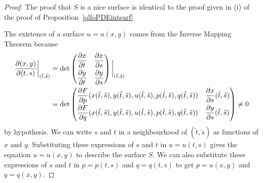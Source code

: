 \begin{proof}
 The proof that $S$ is a nice surface is identical to the
proof given in (i) of the proof of Proposition~\ref{qlfoPDEintsurf}

 The existence of a surface
$u=u(x,y)$ comes from the Inverse Mapping Theorem because
\begin{align*}
\frac{\partial(x,y)}{\partial(t,s)}\bigg|_{(\tilde{t},\tilde{s})} &= \det
\begin{pmatrix}
\displaystyle \frac{\partial{x}}{\partial t} & \displaystyle \frac{\partial{x}}{\partial s} \\[0.7em]
\displaystyle \frac{\partial{y}}{\partial t} & \displaystyle \frac{\partial{y}}{\partial s}
\end{pmatrix}\bigg|_{(\tilde{t},\tilde{s})} \\
&= \det \begin{pmatrix}
\displaystyle
\frac{\partial{F}}{\partial p}(x(\tilde{t},\tilde{s}),y(\tilde{t},\tilde{s}),
u(\tilde{t},\tilde{s}),p(\tilde{t},\tilde{s}),q(\tilde{t},\tilde{s})) &
\displaystyle \frac{\partial{x}}{\partial s}(\tilde{t},\tilde{s}) \\[0.7em]
\displaystyle \frac{\partial{F}}{\partial q}(x(\tilde{t},\tilde{s}),y(\tilde{t},\tilde{s}),
u(\tilde{t},\tilde{s}),p(\tilde{t},\tilde{s}),q(\tilde{t},\tilde{s})) &
\displaystyle \frac{\partial{y}}{\partial s}(\tilde{t},\tilde{s})
\end{pmatrix} \neq 0
\end{align*}
by hypothesis. We can write $s$ and $t$ in a neighbourhood of
$(\tilde{t},\tilde{s})$ as functions of $x$ and $y$.  Substituting
these expressions of $s$ and $t$ in $u=u(t,s)$ gives the equation
$u=u(x,y)$ to describe the surface $S$.  We can also substitute these
expressions of $s$ and $t$ in $p=p(t,s)$ and $q=q(t,s)$ to get
$p=u(x,y)$ and $q=q(x,y)$.


\end{proof}

